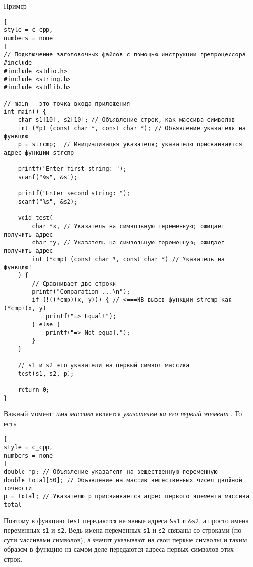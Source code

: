 \documentclass[%
	11pt,
	a4paper,
	utf8,
		]{article}
\begin{document}
Пример
\begin{lstlisting}[
style = c_cpp,
numbers = none
]
// Подключение заголовочных файлов с помощью инструкции препроцессора #include
#include <stdio.h>
#include <string.h>
#include <stdlib.h>

// main - это точка входа приложения
int main() {
	char s1[10], s2[10]; // Объявление строк, как массива символов
	int (*p) (const char *, const char *); // Объявление указателя на функцию
	p = strcmp;  // Инициализация указателя; указателю присваивается адрес функции strcmp
	
	printf("Enter first string: ");
	scanf("%s", &s1);
	
	printf("Enter second string: ");
	scanf("%s", &s2);
	
	void test(
		char *x, // Указатель на символьную переменную; ожидает получить адрес
		char *y, // Указатель на символьную переменную; ожидает получить адрес
		int (*cmp) (const char *, const char *) // Указатель на функцию!
	) {
		// Сравнивает две строки
		printf("Comparation ...\n");
		if (!((*cmp)(x, y))) { // <===NB вызов функции strcmp как (*cmp)(x, y)
			printf("=> Equal!");
		} else {
			printf("=> Not equal.");
		}
	}
	
	// s1 и s2 это указатели на первый символ массива
	test(s1, s2, p);
	
	return 0;
}
\end{lstlisting}

Важный момент: \emph{имя массива} является \emph{указателем на его первый элемент} \cite[]{koltzov-c-lang:2019}. То есть
\begin{lstlisting}[
style = c_cpp,
numbers = none
]
double *p; // Объявление указателя на вещественную переменную
double total[50]; // Объявление на массив вещественных чисел двойной точности
p = total; // Указателю p присваивается адрес первого элемента массива total
\end{lstlisting}

Поэтому в функцию \texttt{test} передаются не явные адреса \texttt{\&s1} и \texttt{\&s2}, а просто имена переменных \texttt{s1} и \texttt{s2}. Ведь имена переменных \texttt{s1} и \texttt{s2} связаны со строками (по сути массивами символов), а значит указывают на свои первые символы и таким образом в функцию на самом деле передаются адреса первых символов этих строк. 


\begin{thebibliography}{99}
\end{thebibliography}


\lstlistoflistings{}
\end{document}
